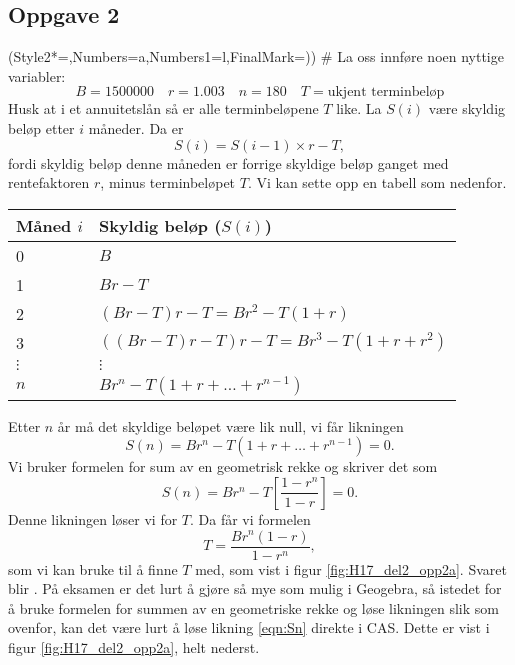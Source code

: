 \subsection*{Oppgave 2}
\begin{easylist}[enumerate]
	\ListProperties(Style2*=,Numbers=a,Numbers1=l,FinalMark={)})
	# La oss innføre noen nyttige variabler:
	\begin{equation*}
		B = 1500000 \quad r = 1.003 \quad n = 180 \quad T = \text{ukjent terminbeløp}
	\end{equation*}
	Husk at i et annuitetslån så er alle terminbeløpene $T$ like.
	La $S(i)$ være skyldig beløp etter $i$ måneder.
	Da er 
	\begin{equation*}
		S(i) = S(i-1) \times r - T,
	\end{equation*}
	fordi skyldig beløp denne måneden er forrige skyldige beløp ganget med rentefaktoren $r$, minus terminbeløpet $T$.
	Vi kan sette opp en tabell som nedenfor.
	\begin{center}
		\begin{tabular}{ll}
			\textbf{Måned} $i$ & \textbf{Skyldig beløp} ($S(i)$)\\ \hline
			0 & $B$  \\
			1 & $Br - T$  \\
			2 & $(Br - T)r - T = Br^2 - T(1+ r)$  \\
			3 & $((Br - T)r - T)r - T = Br^3 - T(1+ r + r^2)$  \\
			$\vdots$ & $\vdots$ \\
			$n$ & $Br^n - T(1+ r + \dots + r^{n-1})$ 
		\end{tabular}
	\end{center}
	Etter $n$ år må det skyldige beløpet være lik null, vi får likningen
	\begin{equation}
	\label{eqn:Sn}
		S(n) = Br^n - T(1+ r + \dots + r^{n-1}) = 0.
	\end{equation}
	Vi bruker formelen for sum av en geometrisk rekke og skriver det som
	\begin{equation*}
	S(n) = Br^n - T \left[ \frac{1 - r^n}{1 - r} \right] = 0.
	\end{equation*}
	Denne likningen løser vi for $T$. Da får vi formelen
	\begin{equation*}
		T = \frac{B r^n (1 - r)}{1 - r^n},
	\end{equation*}
	som vi kan bruke til å finne $T$ med, som vist i figur \ref{fig:H17_del2_opp2a}.
	Svaret blir . 
	På eksamen er det lurt å gjøre så mye som mulig i Geogebra, så istedet for å bruke formelen for summen av en geometriske rekke og løse likningen slik som ovenfor, kan det være lurt å løse likning \eqref{eqn:Sn} direkte i CAS.
	Dette er vist i figur \ref{fig:H17_del2_opp2a}, helt nederst.
	

\end{easylist}
